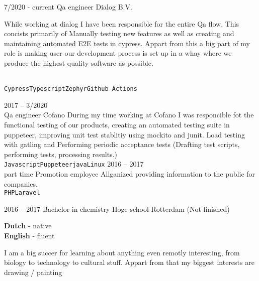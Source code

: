 \documentclass[9pt]{developercv} %
\begin{document}
    \begin{entrylist}
        \entry
        {7/2020 - current}
        {Qa engineer}
        {Dialog B.V.}
        {While working at dialog I have been responsible for the entire Qa flow. This concists primarily of Manually testing new features as well as creating and maintaining automated E2E tests in cypress.
            Appart from this a big part of my role is making user our development process is set up in a whay where we produce the highest quality software as possible.

        \\ \texttt{Cypress}\slashsep\texttt{Typescript}\slashsep\texttt{Zephyr}\slashsep\texttt{Github Actions}}
        \entry
        {2017 -- 3/2020\\}
        {Qa engineer}
        {Cofano}
        {During my time working at Cofano I was responcible fot the functional testing of our products,
            creating an automated testing suite in puppeteer,
            improving unit test stablitiy using mockito and junit.
            Load testing with gatling and
            Performing periodic acceptance tests (Drafting test scripts, performing tests, processing results.)\\ \texttt{Javascript}\slashsep\texttt{Puppeteer}\slashsep\texttt{java}\slashsep\texttt{Linux}}
        \entry
        {2016 -- 2017\\\footnotesize{part time}}
        {Promotion employee}
        {Allganized}
        {providing information to the public for companies.\\ \texttt{PHP}\slashsep\texttt{Laravel}}
    \end{entrylist}


        \entry
        {2016 -- 2017}
        {Bachelor in chemistry}
        {Hoge school Rotterdam}
        {(Not finished)}

    \begin{minipage}[t]{0.3\textwidth}
        \vspace{-\baselineskip} %


        \textbf{Dutch} - native\\
        \textbf{English} - fluent
    \end{minipage}
    \hfill
    \begin{minipage}[t]{0.5\textwidth}
        \vspace{-\baselineskip} %


        {I am a big succer for learning about anything even remotly interesting, from biology to technology to cultural stuff. Appart from that my biggest interests are drawing / painting}
    \end{minipage}
    \hfill

\end{document}
